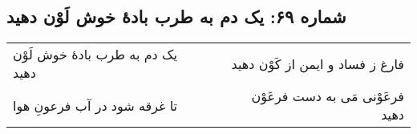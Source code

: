 \begin{center}
\section*{شماره ۶۹: یک دم به طرب بادۀ خوش لَوْن دهید}
\label{sec:069}
\begin{longtable}{l p{0.5cm} r}
یک دم به طرب بادهٔ خوش لَوْن دهید
&&
فارغ ز فساد و ایمن از کَوْن دهید
\\
تا غرقه شود در آب فرعونِ هوا
&&
فرعَوْنی مَی به دست فرعَوْن دهید
\\
\end{longtable}
\end{center}
